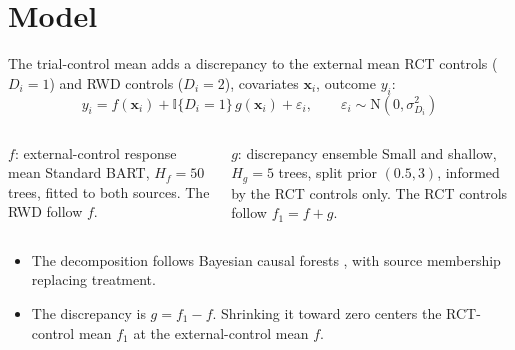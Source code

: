\documentclass[11pt,aspectratio=169]{beamer}
\newcommand{\Normal}{\mathrm{N}}
\newcommand{\bx}{\bm{x}}
\begin{document}
\section{Model}
\begin{frame}{The trial-control mean adds a discrepancy to the external mean}
  \small
  RCT controls ($D_i=1$) and RWD controls ($D_i=2$), covariates $\bx_i$, outcome $y_i$:
  \[
    \boxed{\;y_i=f(\bx_i)+\mathbb{I}\{D_i=1\}\,g(\bx_i)+\varepsilon_i,\qquad \varepsilon_i\sim\Normal(0,\sigma^2_{D_i})\;}
  \]
  \begin{columns}[T,onlytextwidth]
      \begin{block}{$f$: external-control response mean}
        Standard BART, $H_f=50$ trees, fitted to both sources. The RWD follow $f$.
      \end{block}
      \begin{block}{$g$: discrepancy ensemble}
        Small and shallow, $H_g=5$ trees, split prior $(0.5,3)$, informed by the RCT controls only. The RCT controls follow $f_1=f+g$.
      \end{block}
  \end{columns}
  \vspace{0.4em}
  \begin{itemize}\footnotesize
    \item The decomposition follows Bayesian causal forests \citep{Hahn2020BCF}, with source membership replacing treatment.
    \item The discrepancy is $g=f_1-f$. Shrinking it toward zero centers the RCT-control mean $f_1$ at the external-control mean $f$.
  \end{itemize}
\end{frame}
\end{document}
